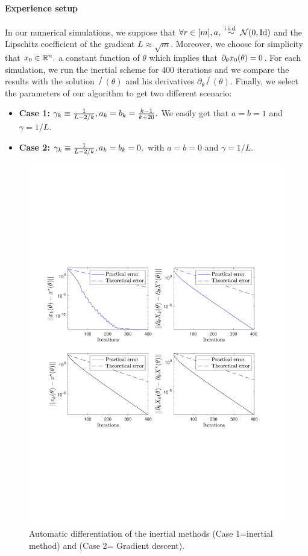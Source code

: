 \paragraph{Experience setup} 
In our numerical simulations, we suppose that $\forall r \in [m],  a_r \stackrel{\footnotesize{\text{i.i.d }}}{\sim}\mathcal{N}(0,\mathrm{Id})$ and the Lipschitz coefficient of the gradient $L\approx\sqrt{m}$. Moreover, we choose for simplicity that  $x_{0}\in\mathbb{R}^n,$ a constant function of $\theta$ which implies that $\partial_{\theta}x_{0}(\theta)=0$. For each simulation, we run the inertial scheme for $400$ iterations and  we compare  the results with the solution $\xsol(\theta)$ and his derivatives $\partial_{\theta}\xsol(\theta)$. Finally,  we select the parameters of our algorithm  to get two different scenario: 
\begin{itemize}
\item \textbf{Case 1:} $\gamma_{k}\equiv\frac{1}{L-2/k}, a_{k}=b_{k}=\frac{k-1}{k+20}.$ We easily get that $a=b=1$ and $\gamma=1/L.$
\item \textbf{Case 2:} $\gamma_{k}\equiv\frac{1}{L-2/k}, a_{k}=b_{k}=0,$ with  $a=b=0$ and $\gamma=1/L.$
\end{itemize}
\begin{figure}[htbp]
\centering
\includegraphics[trim={0cm 8.5cm 0cm 8.5cm},clip,width=1\textwidth]{figures/ls.pdf}
 \caption{Automatic differentiation of the inertial methods (Case 1=inertial method) and (Case 2=  Gradient  descent).}
\label{fig: linea-inv-vstep}
\end{figure} 

